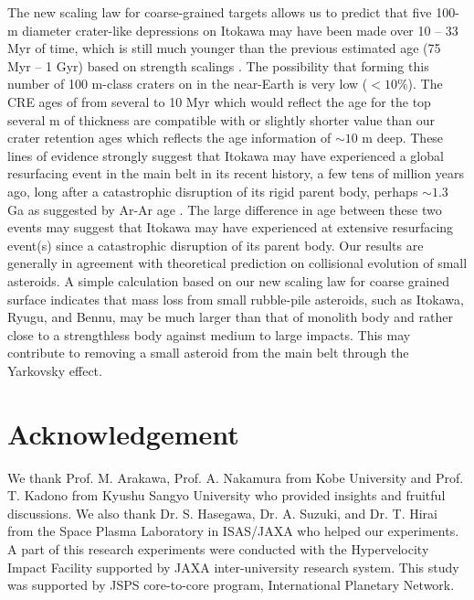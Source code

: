 \documentclass[3p,authoryear]{elsarticle}
\begin{document}
The new scaling law for coarse-grained targets allows us to predict that five 100-m diameter crater-like depressions on Itokawa may have been made over 10 -- 33 Myr of time, which is still much younger than the previous estimated age (75 Myr -- 1 Gyr) based on strength scalings \citep{michel2009}.
The possibility that forming this number of 100 m-class craters on in the near-Earth is very low ($<10$\%).
The CRE ages of from several to 10 Myr which would reflect the age for the top several m of thickness \citep{nagao2011, meier2014, nishiizumi2015} are compatible with or slightly shorter value than  our crater retention ages which reflects the age information of $\sim 10$ m deep.
These lines of evidence strongly suggest that Itokawa may have experienced a global resurfacing event in the main belt in its recent history, a few tens of million years ago, long after a catastrophic disruption of its rigid parent body, perhaps $\sim 1.3$ Ga as suggested by Ar-Ar age \citep{park2015}.
The large difference in age between these two events may suggest that Itokawa may have experienced at extensive resurfacing event(s) since a catastrophic disruption of its parent body.
Our results are generally in agreement with theoretical prediction on collisional evolution of small asteroids.
A simple calculation based on our new scaling law for coarse grained surface indicates that mass loss from small rubble-pile asteroids, such as Itokawa, Ryugu, and Bennu, may be much larger than that of monolith body and rather close to a strengthless body against medium to large impacts.
This may contribute to removing a small asteroid from the main belt through the Yarkovsky effect.

\section*{Acknowledgement}
We thank Prof. M. Arakawa, Prof. A. Nakamura from Kobe University and Prof. T. Kadono from Kyushu Sangyo University who provided insights and fruitful discussions. We also thank Dr. S. Hasegawa, Dr. A. Suzuki, and Dr. T. Hirai from the Space Plasma Laboratory in ISAS/JAXA who helped our experiments. A part of this research experiments were conducted with the Hypervelocity Impact Facility supported by JAXA inter-university research system.
This study was supported by JSPS core-to-core program, International Planetary Network.
\end{document}
